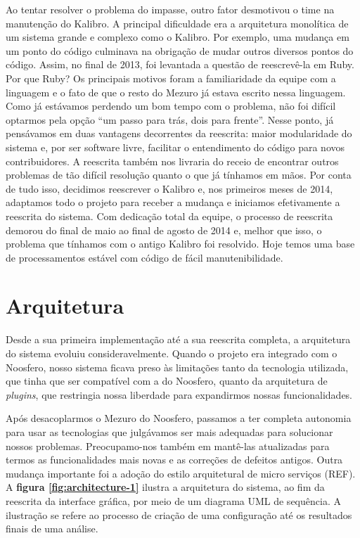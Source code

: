 \documentclass{llncs}
\begin{document}
  Ao tentar resolver o problema do impasse, outro fator desmotivou o time na manutenção do Kalibro. A principal dificuldade era a arquitetura monolítica de um sistema grande e complexo como o Kalibro. Por exemplo, uma mudança em um ponto do código culminava na obrigação de mudar outros diversos pontos do código. Assim, no final de 2013, foi levantada a questão de reescrevê-la em Ruby. Por que Ruby? Os principais motivos foram a familiaridade da equipe com a linguagem e o fato de que o resto do Mezuro já estava escrito nessa linguagem.
  Como já estávamos perdendo um bom tempo com o problema, não foi difícil optarmos pela opção ``um passo para trás, dois para frente''. Nesse ponto, já pensávamos em duas vantagens decorrentes da reescrita: maior modularidade do sistema e, por ser software livre, facilitar o entendimento do código para novos contribuidores. A reescrita também nos livraria do receio de encontrar outros problemas de tão difícil resolução quanto o que já tínhamos em mãos. Por conta de tudo isso, decidimos reescrever o Kalibro e, nos primeiros meses de 2014, adaptamos todo o projeto para receber a mudança e iniciamos efetivamente a reescrita do sistema.
  Com dedicação total da equipe, o processo de reescrita demorou do final de maio ao final de agosto de 2014 e, melhor que isso, o problema que tínhamos com o antigo Kalibro foi resolvido. Hoje temos uma base de processamentos estável com código de fácil manutenibilidade.

\section{Arquitetura}
  Desde a sua primeira implementação até a sua reescrita completa, a arquitetura do sistema evoluiu consideravelmente. Quando o projeto era integrado com o Noosfero, nosso sistema ficava preso às limitações tanto da tecnologia utilizada, que tinha que ser compatível com a do Noosfero, quanto da arquitetura de \textit{plugins}, que restringia nossa liberdade para expandirmos nossas funcionalidades.

  Após desacoplarmos o Mezuro do Noosfero, passamos a ter completa autonomia para usar as tecnologias que julgávamos ser mais adequadas para solucionar nossos problemas. Preocupamo-nos também em mantê-las atualizadas para termos as funcionalidades mais novas e as correções de defeitos antigos. Outra mudança importante foi a adoção do estilo arquitetural de micro serviços (REF). A \textbf{figura \ref{fig:architecture-1}} ilustra a arquitetura do sistema, ao fim da reescrita da interface gráfica, por meio de um diagrama UML de sequência. A ilustração se refere ao processo de criação de uma configuração até os resultados finais de uma análise.
\end{document}
